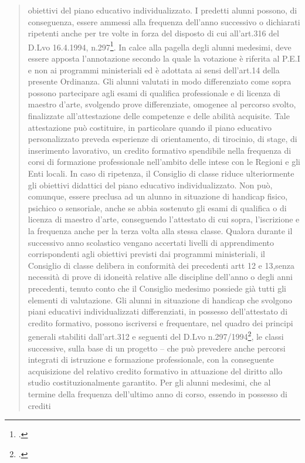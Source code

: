 \begin{quote}
\begin{description}
\begin{enumerate}
				obiettivi del piano educativo individualizzato. I predetti alunni possono, di conseguenza, essere
				ammessi alla frequenza dell'anno successivo o dichiarati ripetenti anche per tre volte in forza del
				disposto di cui all’art.316 del D.Lvo 16.4.1994, n.297\footcite{dl_297_1994}. In calce alla pagella degli alunni medesimi,
				deve essere apposta l'annotazione secondo la quale la votazione è riferita al P.E.I e non ai
				programmi ministeriali ed è adottata ai sensi dell'art.14 della presente Ordinanza. Gli alunni
				valutati in modo differenziato come sopra possono partecipare agli esami di qualifica professionale
				e di licenza di maestro d'arte, svolgendo prove differenziate, omogenee al percorso svolto,
				finalizzate all'attestazione delle competenze e delle abilità acquisite. Tale attestazione può
				costituire, in particolare quando il piano educativo personalizzato preveda esperienze di
				orientamento, di tirocinio, di stage, di inserimento lavorativo, un credito formativo spendibile nella
				frequenza di corsi di formazione professionale nell'ambito delle intese con le Regioni e gli Enti
				locali. In caso di ripetenza, il Consiglio di classe riduce ulteriormente gli obiettivi didattici del piano
				educativo individualizzato. Non può, comunque, essere preclusa ad un alunno in situazione di
				handicap fisico, psichico o sensoriale, anche se abbia sostenuto gli esami di qualifica o di licenza
				di maestro d'arte, conseguendo l'attestato di cui sopra, l'iscrizione e la frequenza anche per la
				terza volta alla stessa classe. Qualora durante il successivo anno scolastico vengano accertati
				livelli di apprendimento corrispondenti agli obiettivi previsti dai programmi ministeriali, il Consiglio di
				classe delibera in conformità dei precedenti artt 12 e 13,senza necessità di prove di idoneità
				relative alle discipline dell'anno o degli anni precedenti, tenuto conto che il Consiglio medesimo
				possiede già tutti gli elementi di valutazione. Gli alunni in situazione di handicap che svolgono piani educativi individualizzati differenziati, in possesso dell'attestato di credito formativo, possono
				iscriversi e frequentare, nel quadro dei principi generali stabiliti dall’art.312 e seguenti del D.Lvo n.297/1994\footcite{dl_297_1994}, le classi successive, sulla base di un progetto – che può prevedere anche percorsi
				integrati di istruzione e formazione professionale, con la conseguente acquisizione del relativo
				credito formativo in attuazione del diritto allo studio costituzionalmente garantito. Per gli alunni
				medesimi, che al termine della frequenza dell'ultimo anno di corso, essendo in possesso di crediti

\end{enumerate}
\end{description}
\end{quote}
